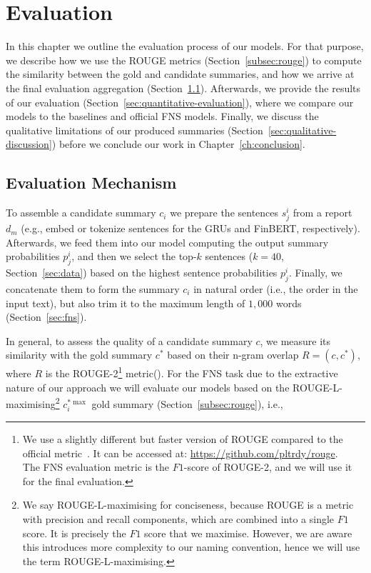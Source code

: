 \chapter{Evaluation}\label{ch:evaluation}
In this chapter we outline the evaluation process of our models.
For that purpose, we describe how we use the ROUGE metrics (Section~\ref{subsec:rouge}) to compute the
similarity between the gold and candidate summaries, and how we arrive at the final evaluation aggregation (Section~\ref{sec:evaluation-mechanism}).
Afterwards, we provide the results of our evaluation (Section~\ref{sec:quantitative-evaluation}), where we compare our models to the baselines and official FNS models.
Finally, we discuss the qualitative limitations of our produced summaries (Section~\ref{sec:qualitative-discussion}) before we conclude our work in Chapter~\ref{ch:conclusion}.

\section{Evaluation Mechanism}\label{sec:evaluation-mechanism}
To assemble a candidate summary $c_{i}$ we prepare the sentences $s_{j}^{i}$ from a report $d_{m}$ (e.g., embed or tokenize sentences for the GRUs and FinBERT, respectively).
Afterwards, we feed them into our model computing the output summary probabilities $p_{j}^{i}$, and then we select the
top-$k$ sentences ($k=40$, Section~\ref{sec:data}) based on the highest sentence probabilities $p_{j}^{i}$.
Finally, we concatenate them to form the summary $c_{i}$ in natural order (i.e., the order in the input text),
but also trim it to the maximum length of $1,000$ words (Section~\ref{sec:fns}).

In general, to assess the quality of a candidate summary $c$, we measure its similarity with the gold summary $c^{*}$
based on their n-gram overlap $R=(c, c^{*})$, where $R$ is the ROUGE-2\footnote{
        We use a slightly different but faster version of ROUGE compared to the official metric~\cite{lin2004rouge}.
        It can be accessed at: \url{https://github.com/pltrdy/rouge}. \\
        The FNS evaluation metric is the $F1$-score of ROUGE-2, and we will use it for the final evaluation.
} metric(\cite{lin2004rouge}).
For the FNS task due to the extractive nature of our approach we will evaluate our models based on
the ROUGE-L-maximising\footnote{
    We say ROUGE-L-maximising for conciseness, because ROUGE is a metric with precision and recall components, which are combined into a single $F1$ score.
    It is precisely the $F1$ score that we maximise.
    However, we are aware this introduces more complexity to our naming convention, hence we will use the term ROUGE-L-maximising.
} $c^{*\max}_{i}$ gold summary (Section~\ref{subsec:rouge}), i.e.,

